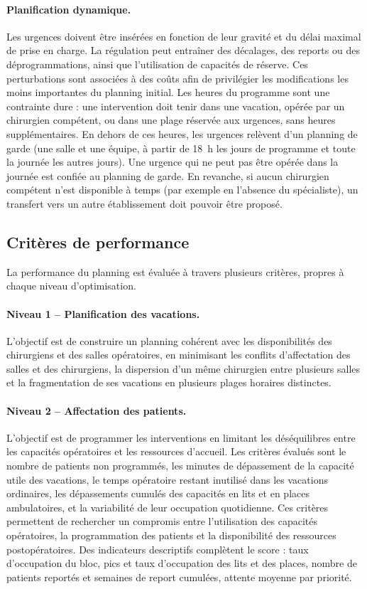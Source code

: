 \documentclass[11pt,a4paper]{article}
\begin{document}
\paragraph{Planification dynamique.}
Les urgences doivent être insérées en fonction de leur gravité et du délai maximal de prise en charge. La régulation peut entraîner des décalages, des reports ou des déprogrammations, ainsi que l'utilisation de capacités de réserve. Ces perturbations sont associées à des coûts afin de privilégier les modifications les moins importantes du planning initial. Les heures du programme sont une contrainte dure : une intervention doit tenir dans une vacation, opérée par un chirurgien compétent, ou dans une plage réservée aux urgences, sans heures supplémentaires. En dehors de ces heures, les urgences relèvent d'un planning de garde (une salle et une équipe, à partir de 18~h les jours de programme et toute la journée les autres jours). Une urgence qui ne peut pas être opérée dans la journée est confiée au planning de garde. En revanche, si aucun chirurgien compétent n'est disponible à temps (par exemple en l'absence du spécialiste), un transfert vers un autre établissement doit pouvoir être proposé.


\subsection{Critères de performance}

La performance du planning est évaluée à travers plusieurs critères, propres à chaque niveau d'optimisation.

\paragraph{Niveau 1 -- Planification des vacations.}
L'objectif est de construire un planning cohérent avec les disponibilités des chirurgiens et des salles opératoires, en minimisant les conflits d'affectation des salles et des chirurgiens, la dispersion d'un même chirurgien entre plusieurs salles et la fragmentation de ses vacations en plusieurs plages horaires distinctes.

\paragraph{Niveau 2 -- Affectation des patients.}
L'objectif est de programmer les interventions en limitant les déséquilibres entre les capacités opératoires et les ressources d'accueil. Les critères évalués sont le nombre de patients non programmés, les minutes de dépassement de la capacité utile des vacations, le temps opératoire restant inutilisé dans les vacations ordinaires, les dépassements cumulés des capacités en lits et en places ambulatoires, et la variabilité de leur occupation quotidienne. Ces critères permettent de rechercher un compromis entre l'utilisation des capacités opératoires, la programmation des patients et la disponibilité des ressources postopératoires. Des indicateurs descriptifs complètent le score : taux d'occupation du bloc, pics et taux d'occupation des lits et des places, nombre de patients reportés et semaines de report cumulées, attente moyenne par priorité.
\end{document}
